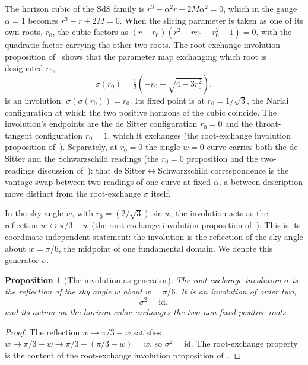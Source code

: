 \documentclass[11pt,a4paper]{article}
\newtheorem{proposition}[theorem]{Proposition}
\theoremstyle{definition}
\begin{document}
The horizon cubic of the SdS family is $r^{3}-\alpha^{2}r+2M\alpha^{2}=0$, which in the gauge $\alpha=1$ becomes $r^{3}-r+2M=0$. When the slicing parameter is taken as one of its own roots, $r_{0}$, the cubic factors as $(r-r_{0})(r^{2}+rr_{0}+r_{0}^{2}-1)=0$, with the quadratic factor carrying the other two roots. The root-exchange involution proposition of~\cite{JanzenSlicing} shows that the parameter map exchanging which root is designated $r_{0}$,
\begin{equation}\label{eq:f}
\sigma(r_{0})=\tfrac{1}{2}\left(-r_{0}+\sqrt{4-3r_{0}^{2}}\right),
\end{equation}
is an involution: $\sigma(\sigma(r_{0}))=r_{0}$. Its fixed point is at $r_{0}=1/\sqrt{3}$, the Nariai configuration at which the two positive horizons of the cubic coincide. The involution's endpoints are the de Sitter configuration $r_{0}=0$ and the throat-tangent configuration $r_{0}=1$, which it exchanges (the root-exchange involution proposition of~\cite{JanzenSlicing}). Separately, at $r_{0}=0$ the single $w=0$ curve carries both the de Sitter and the Schwarzschild readings (the $r_{0}=0$ proposition and the two-readings discussion of~\cite{JanzenSlicing}): that de Sitter$\leftrightarrow$Schwarzschild correspondence is the vantage-swap between two readings of one curve at fixed $\alpha$, a between-description move distinct from the root-exchange $\sigma$ itself.

In the sky angle $w$, with $r_{0}=(2/\sqrt{3})\sin w$, the involution acts as the reflection $w\leftrightarrow \pi/3 - w$ (the root-exchange involution proposition of~\cite{JanzenSlicing}). This is its coordinate-independent statement: the involution is the reflection of the sky angle about $w=\pi/6$, the midpoint of one fundamental domain. We denote this generator $\sigma$.

\begin{proposition}[The involution as generator]\label{prop:sigma}
The root-exchange involution $\sigma$ is the reflection of the sky angle $w$ about $w=\pi/6$. It is an involution of order two,
\[
\sigma^{2}=\text{id},
\]
and its action on the horizon cubic exchanges the two non-fixed positive roots.
\end{proposition}

\begin{proof}
The reflection $w\to\pi/3-w$ satisfies $w\to\pi/3-w\to\pi/3-(\pi/3-w)=w$, so $\sigma^{2}=\text{id}$. The root-exchange property is the content of the root-exchange involution proposition of~\cite{JanzenSlicing}.
\end{proof}
\end{document}
